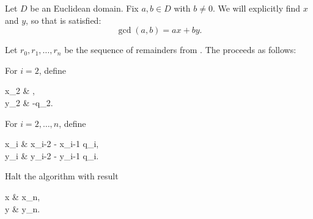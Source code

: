 \begin{algorithm}\label{alg:extended_euclidean_algorithm}
  Let \( D \) be an Euclidean domain. Fix \( a, b \in D \) with \( b \neq 0 \). We will explicitly find \( x \) and \( y \), so that  is satisfied:
  \begin{equation*}
    \gcd(a, b) = ax + by.
  \end{equation*}

  Let \( r_0, r_1, \ldots, r_n \) be the sequence of remainders from . The  proceeds as follows:

  \begin{thmenum}
     For \( i = 2 \), define
    \begin{balign*}
      x_2 & ,    \\
      y_2 & \coloneqq -q_2.
    \end{balign*}

     For \( i = 2, \ldots, n \), define
    \begin{balign*}
      x_i & \coloneqq x_{i-2} - x_{i-1} q_i, \\
      y_i & \coloneqq y_{i-2} - y_{i-1} q_i.
    \end{balign*}

     Halt the algorithm with result
    \begin{balign*}
      x & \coloneqq x_n, \\
      y & \coloneqq y_n.
    \end{balign*}
  \end{thmenum}
\end{algorithm}

